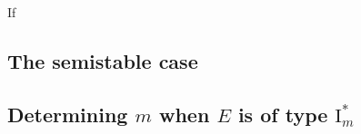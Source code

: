 
If 

\subsection{The semistable case} \label{sec:the_semistable_case}


\subsection{Determining $m$ when $E$ is of type $\mathrm I_m^*$} \label{sec:determining_m_when_e_is_of_type_ims$}


